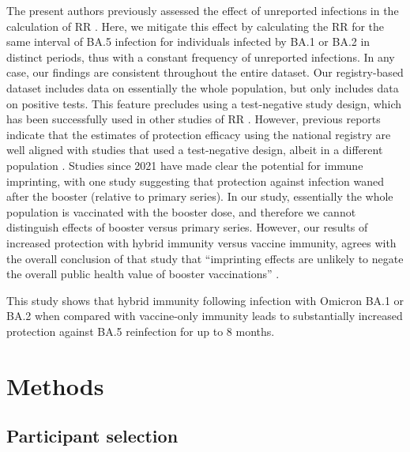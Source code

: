 The present authors previously assessed the effect of unreported infections in the calculation of RR \citep{malatoRiskBAInfection2022}. Here, we mitigate this effect by calculating the RR for the same interval of BA.5 infection for individuals infected by BA.1 or BA.2 in distinct periods, thus with a constant frequency of unreported infections. In any case, our findings are consistent throughout the entire dataset. Our registry-based dataset includes data on essentially the whole population, but only includes data on positive tests. This feature precludes using a test-negative study design, which has been successfully used in other studies of RR \citep{altarawneh2022ProtectiveEffect, ayoub2022EstimatingProtection}. However, previous reports indicate that the estimates of protection efficacy using the national registry are well aligned with studies that used a test-negative design, albeit in a different population \citep{malatoRiskBAInfection2022, altarawneh2022ProtectiveEffect}. Studies since 2021 have made clear the potential for immune imprinting, with one study \citep{chemaitelly2022ProtectionReinfection} suggesting that protection against infection waned after the booster (relative to primary series). In our study, essentially the whole population is vaccinated with the booster dose, and therefore we cannot distinguish effects of booster versus primary series. However, our results of increased protection with hybrid immunity versus vaccine immunity, agrees with the overall conclusion of that study that ``imprinting effects are unlikely to negate the overall public health value of booster vaccinations'' \citep{chemaitelly2022ProtectionReinfection}.

This study shows that hybrid immunity following infection with Omicron BA.1 or BA.2 when compared with vaccine-only immunity leads to substantially increased protection against BA.5 reinfection for up to 8 months.

\section{Methods}
\label{2023-sec:covid19-02-methods}

\subsection{Participant selection}

